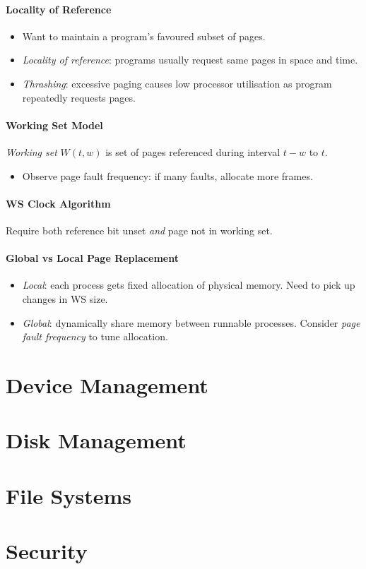\documentclass[twocolumn,english]{article}
\begin{document}
\paragraph{Locality of Reference}
\begin{itemize}
\item Want to maintain a program's favoured subset of pages.
\item \emph{Locality of reference}: programs usually request same pages
in space and time.
\item \emph{Thrashing}: excessive paging causes low processor utilisation
as program repeatedly requests pages.
\end{itemize}

\paragraph{Working Set Model}

\emph{Working set} $W\left(t,w\right)$ is set of pages referenced
during interval $t-w$ to $t$.
\begin{itemize}
\item Observe page fault frequency: if many faults, allocate more frames.
\end{itemize}

\paragraph{WS Clock Algorithm}

Require both reference bit unset \emph{and} page not in working set.

\paragraph{Global vs Local Page Replacement}
\begin{itemize}
\item \emph{Local}: each process gets fixed allocation of physical memory.
Need to pick up changes in WS size.
\item \emph{Global}: dynamically share memory between runnable processes.
Consider \emph{page fault frequency} to tune allocation.
\end{itemize}

\section{Device Management}

\section{Disk Management}

\section{File Systems}

\section{Security}
\end{document}
